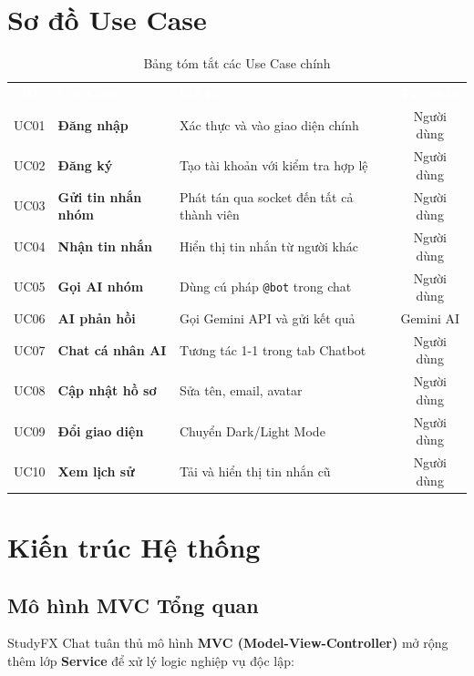 \documentclass[12pt, a4paper, oneside]{report}
\newcommand{\code}[1]{\texttt{\color{hustblue!80!black}#1}}
\newcommand{\rA}{\rowcolor{rowA}}
\newcommand{\rB}{\rowcolor{rowB}}
\begin{document}
\section{Sơ đồ Use Case}

\begin{table}[H]
  \centering
  \caption{Bảng tóm tắt các Use Case chính}
  \label{tab:usecase}
  \begin{tabularx}{\linewidth}{c >{\bfseries\color{hustblue}}l X c}
    \rowcolor{headerrow}
    \textcolor{white}{\textbf{ID}} &
    \textcolor{white}{\textbf{Use Case}} &
    \textcolor{white}{\textbf{Mô tả}} &
    \textcolor{white}{\textbf{Tác nhân}} \\
    \rA UC01 & Đăng nhập & Xác thực và vào giao diện chính & Người dùng \\
    \rB UC02 & Đăng ký   & Tạo tài khoản với kiểm tra hợp lệ & Người dùng \\
    \rA UC03 & Gửi tin nhắn nhóm & Phát tán qua socket đến tất cả thành viên & Người dùng \\
    \rB UC04 & Nhận tin nhắn & Hiển thị tin nhắn từ người khác & Người dùng \\
    \rA UC05 & Gọi AI nhóm & Dùng cú pháp \code{@bot} trong chat & Người dùng \\
    \rB UC06 & AI phản hồi & Gọi Gemini API và gửi kết quả & Gemini AI \\
    \rA UC07 & Chat cá nhân AI & Tương tác 1-1 trong tab Chatbot & Người dùng \\
    \rB UC08 & Cập nhật hồ sơ & Sửa tên, email, avatar & Người dùng \\
    \rA UC09 & Đổi giao diện & Chuyển Dark/Light Mode & Người dùng \\
    \rB UC10 & Xem lịch sử & Tải và hiển thị tin nhắn cũ & Người dùng \\
  \end{tabularx}
\end{table}

\section{Kiến trúc Hệ thống}

\subsection{Mô hình MVC Tổng quan}

StudyFX Chat tuân thủ mô hình \textbf{MVC (Model-View-Controller)} mở rộng
thêm lớp \textbf{Service} để xử lý logic nghiệp vụ độc lập:
\end{document}
